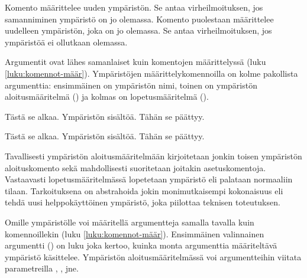 \begin{koodilohkosis}
  \newenvironment   {nimi}[n][oletus]{aloitus}{lopetus}
  \renewenvironment {nimi}[n][oletus]{aloitus}{lopetus}
\end{koodilohkosis}

Komento  määrittelee uuden ympäristön. Se
antaa virheilmoituksen, jos samanniminen ympäristö on jo olemassa.
Komento  puolestaan määrittelee uudelleen
ympäristön, joka on jo olemassa. Se antaa virheilmoituksen, jos
ympäristöä ei ollutkaan olemassa.

Argumentit ovat lähes samanlaiset kuin komentojen määrittelyssä (luku
\ref{luku:komennot-määr}). Ympäristöjen määrittelykomennoilla on kolme
pakollista argumenttia: ensimmäinen on ympäristön nimi, toinen on
ympäristön aloitusmääritelmä () ja kolmas on
lopetusmääritelmä ().

\begin{koodilohkosis}
  \newenvironment{ymp}{Tästä se alkaa.}{Tähän se päättyy.}

  \begin{ymp}
    Ympäristön sisältöä.
  \end{ymp}
\end{koodilohkosis}

\begin{tulossis}
  Tästä se alkaa. Ympäristön sisältöä. Tähän se päättyy.
\end{tulossis}

Tavallisesti ympäristön aloitusmääritelmään kirjoitetaan jonkin toisen
ympäristön aloituskomento sekä mahdollisesti suoritetaan joitakin
asetuskomentoja. Vastaavasti lopetusmääritelmässä lopetetaan ympäristö
eli palataan normaaliin tilaan. Tarkoituksena on abstrahoida jokin
monimutkaisempi kokonaisuus eli tehdä uusi helppokäyttöinen ympäristö, joka
piilottaa teknisen toteutuksen.

\begin{koodilohkosis}
  \newenvironment{ymp}
  {\begin{mahtavuus}
      \omia\hienoja\asetuksia}
    {\end{mahtavuus}}
\end{koodilohkosis}

Omille ympäristölle voi määritellä argumentteja samalla tavalla kuin
komennoillekin (luku \ref{luku:komennot-määr}). Ensimmäinen valinnainen
argumentti () on luku joka kertoo, kuinka monta argumenttia
määriteltävä ympäristö käsittelee. Ympäristön aloitusmääritelmässä voi
argumentteihin viitata parametreilla , ,
 jne.

